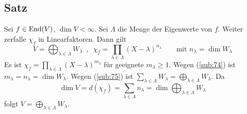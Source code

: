 \subsection[Satz über Summe der verallg. Eigenräume und $\chi_f$, wenn dies in Linearfaktoren zerfällt]{Satz} %
\label{sub:76}
Sei $f \in \operatorname{End}(V)$, $\dim V < \infty$. Sei $\Lambda$ die Menge der Eigenwerte von $f$. Weiter zerfalle $\chi_f$ in Linearfaktoren. Dann gilt
\[
	V = \bigoplus_{\lambda  \in \Lambda } W_\lambda \enspace, \enspace \chi_f = \prod_{\lambda \in \Lambda} (X-\lambda )^{n_\lambda } 
	\qquad \text{mit } n_\lambda  = \dim W_\lambda 
\]
Es ist $\chi_f = \prod_{\lambda \in \Lambda} (X-\lambda )^{m_\lambda }$ für geeignete $m_\lambda  \ge 1$. Wegen (\ref{sub:74}) ist 
$m_\lambda  = n_\lambda = \dim W_\lambda $. Wegen (\ref{sub:75}) ist $\sum_{\lambda \in \Lambda} W_\lambda  = \bigoplus_{\lambda  \in \Lambda} W_\lambda  $. Da 
\[
	\dim V = d(\chi_f)=  \sum_{\lambda \in \Lambda} n_\lambda  = \dim \bigoplus_{\lambda \in \Lambda} W_\lambda 
\]
folgt $V= \bigoplus_{\lambda  \in \Lambda} W_\lambda $. \bewende 

